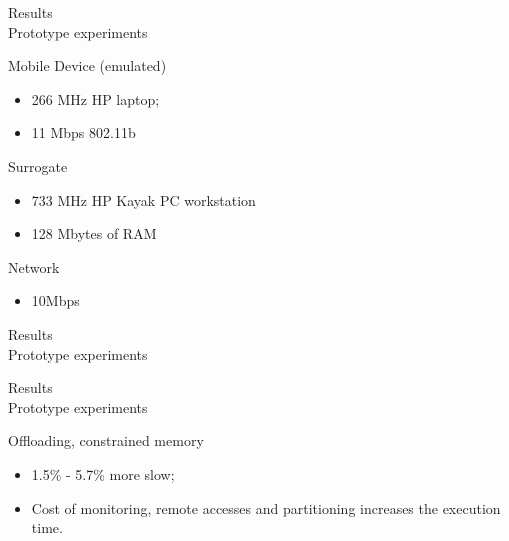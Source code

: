 \begin{frame}{Results \\ \small Prototype experiments}
\begin{block}{Mobile Device (emulated)}
\begin{itemize}
\item 266 MHz HP laptop;
\item 11 Mbps 802.11b
\end{itemize}
\end{block}	

\begin{block}{Surrogate}
\begin{itemize}
\item 733 MHz HP Kayak PC workstation
\item 128 Mbytes of RAM
\end{itemize}
\end{block}	

\begin{block}{Network}
\begin{itemize}
\item 10Mbps
\end{itemize}
\end{block}	


\end{frame}

\begin{frame}{Results \\ \small Prototype experiments}




\end{frame}

\begin{frame}{Results \\ \small Prototype experiments}


\begin{block}{Offloading, constrained memory}
\begin{itemize}
\item 1.5\% - 5.7\% more slow;
\item Cost of monitoring, remote accesses and partitioning increases the execution time.
\end{itemize}
\end{block}	
\end{frame}


